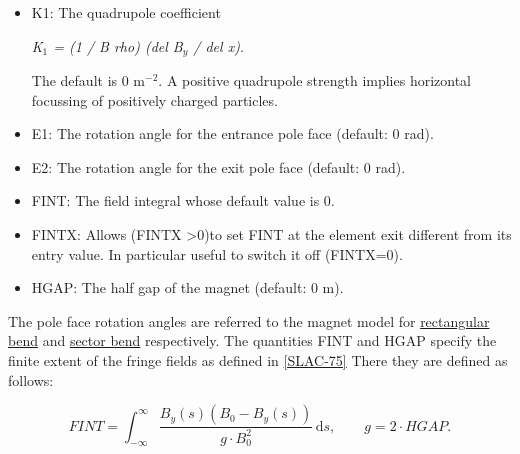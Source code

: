 \begin{itemize}







	\item K1: The quadrupole coefficient 

\textit{K$_1$ = (1 / B rho) (del B$_y$ / del x)}. 

 The default is 0 m$^{-2}$. A positive quadrupole strength implies horizontal focussing of positively charged particles. 
	\item E1: The rotation angle for the entrance pole face (default: 0 rad). 
	\item E2: The rotation angle for the exit pole face (default: 0 rad). 
	\item FINT: The field integral whose default value is 0. 
	\item FINTX: Allows (FINTX \textgreater 0)to set FINT at the element exit different from its entry value. In particular useful to switch it off (FINTX=0). 
	\item HGAP: The half gap of the magnet (default: 0 m). 
\end{itemize} The pole face rotation angles are referred to the magnet model for \href{local_system.html#rbend}{rectangular bend} and \href{local_system.html#sbend}{sector bend} respectively. The quantities FINT and HGAP specify the finite extent of the fringe fields as defined in \href{bibliography.html#slac75}{[SLAC-75]} There they are defined as follows: 


\[
FINT=\int_{-\infty}^\infty \frac{B_y(s)(B_0-B_y(s))}{g \cdot B_0^2}\,\mathrm{d}s ,\quad\quad g=2\cdot HGAP.
\]

